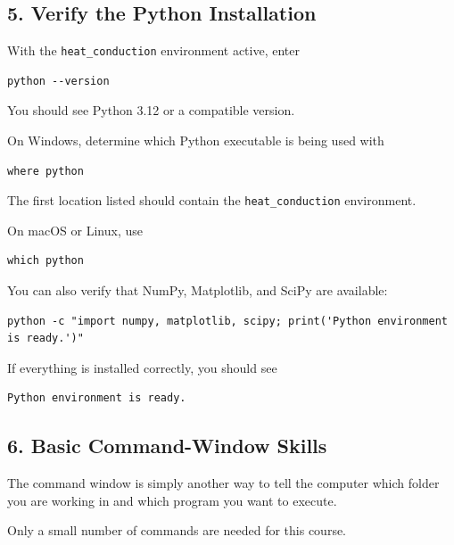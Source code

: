 \documentclass[11pt]{article}
\begin{document}
\subsection*{5. Verify the Python Installation}

With the \texttt{heat\_conduction} environment active, enter

\begin{lstlisting}
python --version
\end{lstlisting}

You should see Python 3.12 or a compatible version.

On Windows, determine which Python executable is being used with

\begin{lstlisting}
where python
\end{lstlisting}

The first location listed should contain the
\texttt{heat\_conduction} environment.

On macOS or Linux, use

\begin{lstlisting}
which python
\end{lstlisting}

You can also verify that NumPy, Matplotlib, and SciPy are available:

\begin{lstlisting}
python -c "import numpy, matplotlib, scipy; print('Python environment is ready.')"
\end{lstlisting}

If everything is installed correctly, you should see

\begin{lstlisting}
Python environment is ready.
\end{lstlisting}

\subsection*{6. Basic Command-Window Skills}

The command window is simply another way to tell the computer which
folder you are working in and which program you want to execute.

Only a small number of commands are needed for this course.
\end{document}
